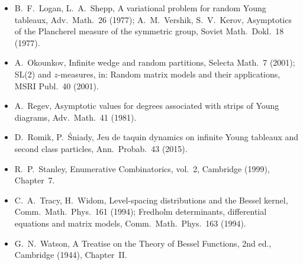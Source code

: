 \documentclass[11pt]{article}
\theoremstyle{definition}
\theoremstyle{remark}
\begin{document}
\begin{itemize}[leftmargin=1.5em]
\item B.~F.~Logan, L.~A.~Shepp, A variational problem for random Young tableaux, Adv.\ Math.\ 26 (1977); A.~M.~Vershik, S.~V.~Kerov, Asymptotics of the Plancherel measure of the symmetric group, Soviet Math.\ Dokl.\ 18 (1977).
\item A.~Okounkov, Infinite wedge and random partitions, Selecta Math.\ 7 (2001); SL(2) and $z$-measures, in: Random matrix models and their applications, MSRI Publ.\ 40 (2001).
\item A.~Regev, Asymptotic values for degrees associated with strips of Young diagrams, Adv.\ Math.\ 41 (1981).
\item D.~Romik, P.~\'Sniady, Jeu de taquin dynamics on infinite Young tableaux and second class particles, Ann.\ Probab.\ 43 (2015).
\item R.~P.~Stanley, Enumerative Combinatorics, vol.~2, Cambridge (1999), Chapter~7.
\item C.~A.~Tracy, H.~Widom, Level-spacing distributions and the Bessel kernel, Comm.\ Math.\ Phys.\ 161 (1994); Fredholm determinants, differential equations and matrix models, Comm.\ Math.\ Phys.\ 163 (1994).
\item G.~N.~Watson, A Treatise on the Theory of Bessel Functions, 2nd ed., Cambridge (1944), Chapter~II.
\end{itemize}
\end{document}
